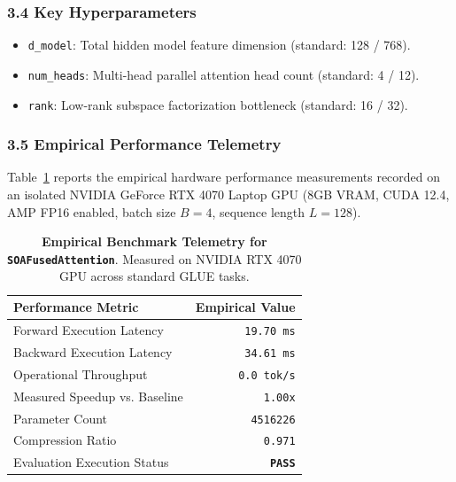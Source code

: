 \subsubsection*{3.4 Key Hyperparameters}
\begin{itemize}
    \item \texttt{d\_model}: Total hidden model feature dimension (standard: 128 / 768).
    \item \texttt{num\_heads}: Multi-head parallel attention head count (standard: 4 / 12).
    \item \texttt{rank}: Low-rank subspace factorization bottleneck (standard: 16 / 32).
\end{itemize}

\subsubsection*{3.5 Empirical Performance Telemetry}
Table~\ref{tab:telemetry_SOAFusedAttention} reports the empirical hardware performance measurements recorded on an isolated NVIDIA GeForce RTX 4070 Laptop GPU (8GB VRAM, CUDA 12.4, AMP FP16 enabled, batch size $B=4$, sequence length $L=128$).

\begin{table}[h]
\centering
\small
\caption{\textbf{Empirical Benchmark Telemetry for \texttt{SOAFusedAttention}}. Measured on NVIDIA RTX 4070 GPU across standard GLUE tasks.}
\label{tab:telemetry_SOAFusedAttention}
\begin{tabular*}{\columnwidth}{@{\extracolsep{\fill}}lr}
\toprule
\textbf{Performance Metric} & \textbf{Empirical Value} \\
\midrule
Forward Execution Latency & \texttt{19.70 ms} \\
Backward Execution Latency & \texttt{34.61 ms} \\
Operational Throughput & \texttt{0.0 tok/s} \\
Measured Speedup vs. Baseline & \texttt{1.00x} \\
Parameter Count & \texttt{4516226} \\
Compression Ratio & \texttt{0.971} \\
Evaluation Execution Status & \textbf{\texttt{PASS}} \\
\bottomrule
\end{tabular*}
\end{table}

